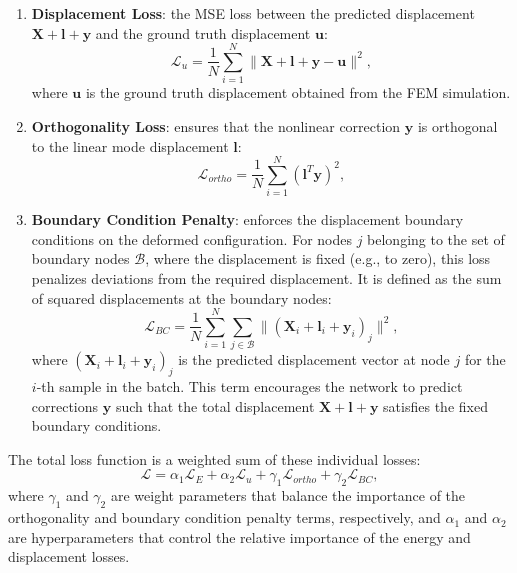 \begin{enumerate}
    \item \textbf{Displacement Loss}: the MSE loss between the predicted displacement \( \bm{X} + \bm{l} + \bm{y} \) and the ground truth displacement \( \bm{u} \):
    \begin{equation}
        \mathcal{L}_u = \frac{1}{N} \sum_{i=1}^N \|\bm{X} + \bm{l} + \bm{y} - \bm{u}\|^2,
    \end{equation}
    where \( \bm{u} \) is the ground truth displacement obtained from the FEM simulation.
    \item \textbf{Orthogonality Loss}: ensures that the nonlinear correction \( \bm{y} \) is orthogonal to the linear mode displacement \( \bm{l} \):
    \begin{equation}
        \mathcal{L}_{ortho} = \frac{1}{N} \sum_{i=1}^N (\bm{l}^T \bm{y})^2,
    \end{equation}

        \item \textbf{Boundary Condition Penalty}: enforces the displacement boundary conditions on the deformed configuration. For nodes \( j \) belonging to the set of boundary nodes \( \mathcal{B} \), where the displacement is fixed (e.g., to zero), this loss penalizes deviations from the required displacement. It is defined as the sum of squared displacements at the boundary nodes:
        \begin{equation}
            \mathcal{L}_{BC} = \frac{1}{N} \sum_{i=1}^N \sum_{j \in \mathcal{B}} \|(\bm{X}_i + \bm{l}_i + \bm{y}_i)_j\|^2,
        \end{equation}
        where \( (\bm{X}_i + \bm{l}_i + \bm{y}_i)_j \) is the predicted displacement vector at node \( j \) for the \( i \)-th sample in the batch. This term encourages the network to predict corrections \( \bm{y} \) such that the total displacement \( \bm{X} + \bm{l} + \bm{y} \) satisfies the fixed boundary conditions.
    
\end{enumerate}

The total loss function is a weighted sum of these individual losses:
\begin{equation}
    \mathcal{L} = \alpha_1 \mathcal{L}_E + \alpha_2 \mathcal{L}_u + \gamma_1 \mathcal{L}_{ortho} + \gamma_2 \mathcal{L}_{BC},
\end{equation}
where $\gamma_1$ and $\gamma_2$ are weight parameters that balance the importance of the orthogonality and boundary condition penalty terms, respectively, and $\alpha_1$ and $\alpha_2$ are hyperparameters that control the relative importance of the energy and displacement losses. 





